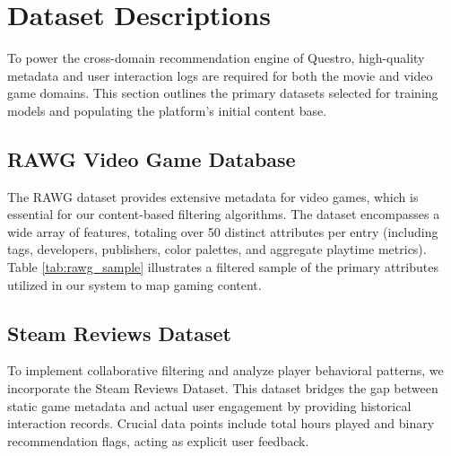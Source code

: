 \section{Dataset Descriptions}
\label{sec:dataset_descriptions}

To power the cross-domain recommendation engine of Questro, high-quality metadata and user interaction logs are required for both the movie and video game domains. This section outlines the primary datasets selected for training models and populating the platform's initial content base.

\subsection{RAWG Video Game Database}
The RAWG dataset provides extensive metadata for video games, which is essential for our content-based filtering algorithms. The dataset encompasses a wide array of features, totaling over 50 distinct attributes per entry (including tags, developers, publishers, color palettes, and aggregate playtime metrics). Table \ref{tab:rawg_sample} illustrates a filtered sample of the primary attributes utilized in our system to map gaming content.

\begin{table}[H]
    \centering
    \caption{Sample Metadata from the RAWG Games Dataset}
    \label{tab:rawg_sample}
    \renewcommand{\arraystretch}{1.3}
\end{table}

\subsection{Steam Reviews Dataset}
To implement collaborative filtering and analyze player behavioral patterns, we incorporate the Steam Reviews Dataset. This dataset bridges the gap between static game metadata and actual user engagement by providing historical interaction records. Crucial data points include total hours played and binary recommendation flags, acting as explicit user feedback.

